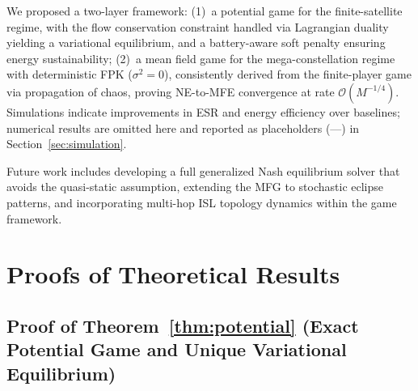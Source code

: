 \documentclass[journal]{IEEEtran}
\begin{document}
We proposed a two-layer framework: (1)~a potential game for the finite-satellite regime, with the flow conservation constraint handled via Lagrangian duality yielding a variational equilibrium, and a battery-aware soft penalty ensuring energy sustainability; (2)~a mean field game for the mega-constellation regime with deterministic FPK ($\sigma^2=0$), consistently derived from the finite-player game via propagation of chaos, proving NE-to-MFE convergence at rate $\mathcal{O}(M^{-1/4})$. Simulations indicate improvements in ESR and energy efficiency over baselines; numerical results are omitted here and reported as placeholders (---) in Section~\ref{sec:simulation}.

Future work includes developing a full generalized Nash equilibrium solver that avoids the quasi-static assumption, extending the MFG to stochastic eclipse patterns, and incorporating multi-hop ISL topology dynamics within the game framework.




\clearpage

\appendices
\section{Proofs of Theoretical Results}
\label{app:proofs}

\subsection{Proof of Theorem~\ref{thm:potential}
(Exact Potential Game and Unique Variational Equilibrium)}
\end{document}
